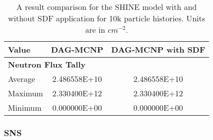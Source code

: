 \begin{table}[H]
  \small
  \begin{center}
    \begin{tabular}{lcc}
          \toprule
          Value   & DAG-MCNP     & DAG-MCNP with SDF      \\
          \toprule
          \multicolumn{3}{l}{\textbf{Neutron Flux Tally}} \\
          Average & 2.486558E+10 & 2.486558E+10           \\
          Maximum & 2.330400E+12 & 2.330400E+12           \\
          Minimum & 0.000000E+00 & 0.000000E+00           \\
          \bottomrule
    \end{tabular}
  \end{center}
  \caption[Flux tally results in the SHINE model for various DAG-MCNP
    implementations.]{A result comparison for the SHINE model with and without
    SDF application for 10k particle histories. Units are in $cm^{-2}$.}
\end{table}

\subsubsection{SNS}

